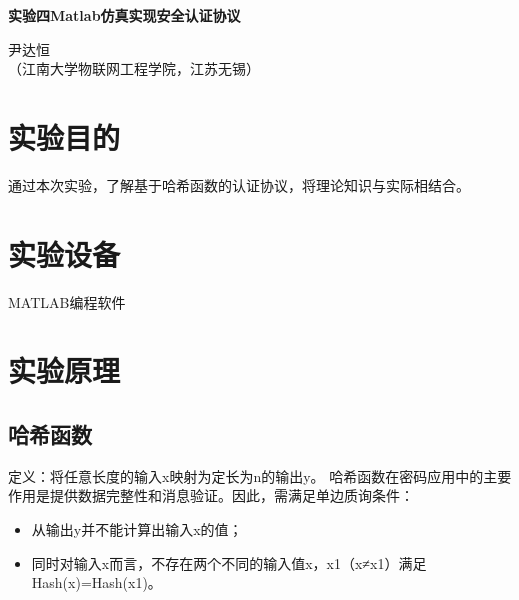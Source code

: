 \documentclass[a4paper]{ctexart}
\begin{document}
\begin{center}
	{\textbf{实验四\quad Matlab仿真实现安全认证协议}}

	{尹达恒}\\[-1mm]

	{（江南大学物联网工程学院，江苏\quad 无锡）}
\end{center}

\renewcommand{\baselinestretch}{1.3}
\section{实验目的}
通过本次实验，了解基于哈希函数的认证协议，将理论知识与实际相结合。

\section{实验设备}
MATLAB编程软件

\section{实验原理}\label{实验原理}
\subsection{哈希函数}
定义：将任意长度的输入x映射为定长为n的输出y。
哈希函数在密码应用中的主要作用是提供数据完整性和消息验证。因此，需满足单边质询条件：
\begin{itemize}
	\item 从输出y并不能计算出输入x的值；
	\item 同时对输入x而言，不存在两个不同的输入值x，x1（x≠x1）满足Hash(x)=Hash(x1)。
\end{itemize}
\end{document}

